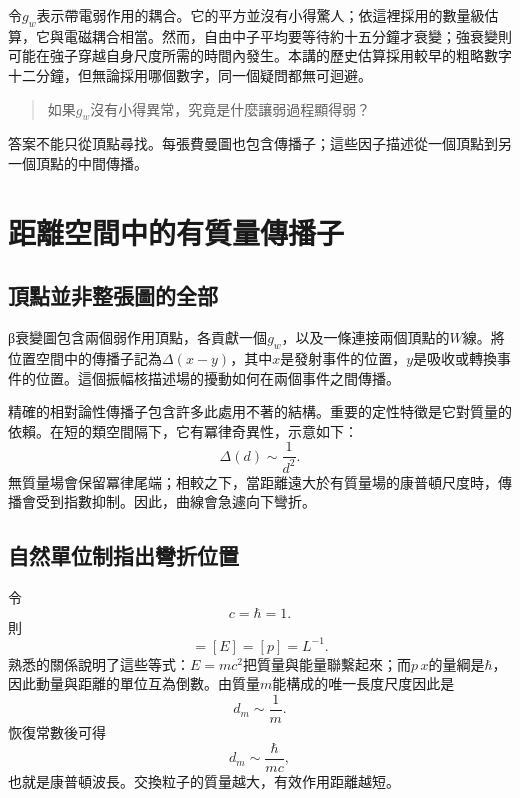令\(g_w\)表示帶電弱作用的耦合。它的平方並沒有小得驚人；依這裡採用的數量級估算，它與電磁耦合相當。然而，自由中子平均要等待約十五分鐘才衰變；強衰變則可能在強子穿越自身尺度所需的時間內發生。本講的歷史估算採用較早的粗略數字十二分鐘，但無論採用哪個數字，同一個疑問都無可迴避。
\begin{quote}
如果\(g_w\)沒有小得異常，究竟是什麼讓弱過程顯得弱？
\end{quote}

答案不能只從頂點尋找。每張費曼圖也包含傳播子；這些因子描述從一個頂點到另一個頂點的中間傳播。

\section{距離空間中的有質量傳播子}

\subsection{頂點並非整張圖的全部}

{\proseunicodefont β}衰變圖包含兩個弱作用頂點，各貢獻一個\(g_w\)，以及一條連接兩個頂點的\(W\)線。將位置空間中的傳播子記為\(\Delta(x-y)\)，其中\(x\)是發射事件的位置，\(y\)是吸收或轉換事件的位置。這個振幅核描述場的擾動如何在兩個事件之間傳播。

精確的相對論性傳播子包含許多此處用不著的結構。重要的定性特徵是它對質量的依賴。在短的類空間隔下，它有冪律奇異性，示意如下：
\begin{equation}
  \Delta(d)\sim\frac1{d^2}.
\end{equation}
無質量場會保留冪律尾端；相較之下，當距離遠大於有質量場的康普頓尺度時，傳播會受到指數抑制。因此，曲線會急遽向下彎折。

\subsection{自然單位制指出彎折位置}

令
\begin{equation}
  c=\hbar=1.
\end{equation}
則
\begin{equation}
  [m]=[E]=[p]=L^{-1}.
\end{equation}
熟悉的關係說明了這些等式：\(E=mc^2\)把質量與能量聯繫起來；而\(p\,x\)的量綱是\(\hbar\)，因此動量與距離的單位互為倒數。由質量\(m\)能構成的唯一長度尺度因此是
\begin{equation}
  d_m\sim\frac1m.
\end{equation}
恢復常數後可得
\begin{equation}
  d_m\sim\frac{\hbar}{mc},
\end{equation}
也就是康普頓波長。交換粒子的質量越大，有效作用距離越短。

